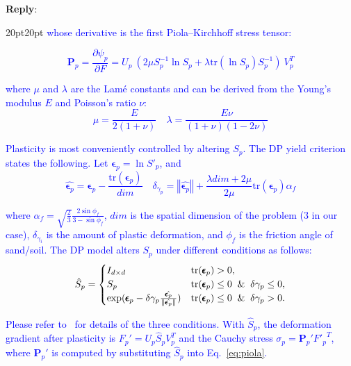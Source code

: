 \documentclass[11pt]{article}
\newenvironment{reply}
   {\medskip \noindent \begin{sf}\textbf{Reply}: \  }
   {\medskip \end{sf}}
\newcommand{\xt}[1]{\textcolor{blue}{#1}}
\begin{document}
\begin{reply}
\begin{adjustwidth}{20pt}{20pt}
\noindent \xt{whose derivative is the first Piola–Kirchhoff stress tensor:}

\xt{\begin{equation}\label{eq:piola}
\bm{P}_p = \frac{\partial\psi_p}{\partial F} = U_p\ (2\mu S^{-1}_p\ln S_p + \lambda \mathrm{tr}(\ln S_p)S^{-1}_p)\ V^T_p
\end{equation}}

\noindent \xt{where $\mu$ and $\lambda$ are the Lam\'e constants and can be derived from the Young's modulus $E$ and Poisson's ratio $\nu$:
\begin{equation}
\mu = \frac{E}{2(1+\nu)} \quad \lambda = \frac{E \nu}{(1+\nu)(1-2\nu)}
\end{equation}}

\xt{Plasticity is most conveniently controlled by altering $S_p$. The DP yield criterion states the following. Let $\pmb{\epsilon}_p = \ln S'_p$, and
\begin{equation}
\hat{\pmb{\epsilon}_p} = \pmb{\epsilon}_p - \frac{\mathrm{tr}(\pmb{\epsilon}_p)}{dim} \quad \delta_{\gamma_{p}} = \left\Vert \hat{\pmb{\epsilon}_p} \right\Vert + \frac{\lambda dim+2\mu}{2\mu}\mathrm{tr}(\pmb{\epsilon}_p) \alpha_f
\end{equation}}

\noindent \xt{where $\alpha_f = \sqrt{\frac{2}{3}}\frac{2\sin{\phi_{f}}}{3-\sin{\phi_{f}}}$, $dim$ is the spatial dimension of the problem ($3$ in our case), $\delta_{\gamma_{i}}$ is the amount of plastic deformation, and $\phi_{f}$ is the friction angle of sand/soil. The DP model alters $S_p$ under different conditions as follows:
\begin{equation}
    \hat{S}_p=
    \begin{cases}
    I_{d \times d} \hfill & \mathrm{tr}(\pmb{\epsilon}_p) > 0,\\
    S_p \hfill & \mathrm{tr}(\pmb{\epsilon}_p) \leq 0 \And \delta \gamma_{p} \leq 0, \\
    \exp(\pmb{\epsilon}_p-\delta \gamma_{p}\frac{\hat{\pmb{\epsilon}_p}}{\|\hat{\pmb{\epsilon}_p}\|}) \hfill & \mathrm{tr}(\pmb{\epsilon}_p) \leq 0 \And \delta \gamma_{p} > 0.
    \end{cases}\label{eq:DP}
\end{equation}}

\xt{Please refer to~\cite{klar2016drucker} for details of the three conditions. With $\hat{S}_p$, the deformation gradient after plasticity is $F_p' = U_p \hat{S}_p V^{T}_p$ and the Cauchy stress $\sigma_p = \bm{P}_p'{F'_p}^T$, where $\bm{P}_p'$ is computed by substituting $\hat{S}_p$ into Eq.~\ref{eq:piola}.}


\end{adjustwidth}
\end{reply}
\end{document}
